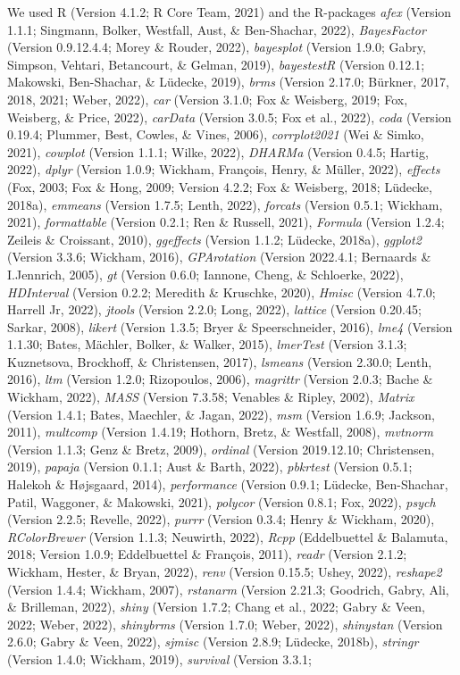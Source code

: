 \documentclass[
  english,
  man]{apa6}
\begin{document}
We used R (Version 4.1.2; R Core Team, 2021) and the R-packages \emph{afex} (Version 1.1.1; Singmann, Bolker, Westfall, Aust, \& Ben-Shachar, 2022), \emph{BayesFactor} (Version 0.9.12.4.4; Morey \& Rouder, 2022), \emph{bayesplot} (Version 1.9.0; Gabry, Simpson, Vehtari, Betancourt, \& Gelman, 2019), \emph{bayestestR} (Version 0.12.1; Makowski, Ben-Shachar, \& Lüdecke, 2019), \emph{brms} (Version 2.17.0; Bürkner, 2017, 2018, 2021; Weber, 2022), \emph{car} (Version 3.1.0; Fox \& Weisberg, 2019; Fox, Weisberg, \& Price, 2022), \emph{carData} (Version 3.0.5; Fox et al., 2022), \emph{coda} (Version 0.19.4; Plummer, Best, Cowles, \& Vines, 2006), \emph{corrplot2021} (Wei \& Simko, 2021), \emph{cowplot} (Version 1.1.1; Wilke, 2022), \emph{DHARMa} (Version 0.4.5; Hartig, 2022), \emph{dplyr} (Version 1.0.9; Wickham, François, Henry, \& Müller, 2022), \emph{effects} (Fox, 2003; Fox \& Hong, 2009; Version 4.2.2; Fox \& Weisberg, 2018; Lüdecke, 2018a), \emph{emmeans} (Version 1.7.5; Lenth, 2022), \emph{forcats} (Version 0.5.1; Wickham, 2021), \emph{formattable} (Version 0.2.1; Ren \& Russell, 2021), \emph{Formula} (Version 1.2.4; Zeileis \& Croissant, 2010), \emph{ggeffects} (Version 1.1.2; Lüdecke, 2018a), \emph{ggplot2} (Version 3.3.6; Wickham, 2016), \emph{GPArotation} (Version 2022.4.1; Bernaards \& I.Jennrich, 2005), \emph{gt} (Version 0.6.0; Iannone, Cheng, \& Schloerke, 2022), \emph{HDInterval} (Version 0.2.2; Meredith \& Kruschke, 2020), \emph{Hmisc} (Version 4.7.0; Harrell Jr, 2022), \emph{jtools} (Version 2.2.0; Long, 2022), \emph{lattice} (Version 0.20.45; Sarkar, 2008), \emph{likert} (Version 1.3.5; Bryer \& Speerschneider, 2016), \emph{lme4} (Version 1.1.30; Bates, Mächler, Bolker, \& Walker, 2015), \emph{lmerTest} (Version 3.1.3; Kuznetsova, Brockhoff, \& Christensen, 2017), \emph{lsmeans} (Version 2.30.0; Lenth, 2016), \emph{ltm} (Version 1.2.0; Rizopoulos, 2006), \emph{magrittr} (Version 2.0.3; Bache \& Wickham, 2022), \emph{MASS} (Version 7.3.58; Venables \& Ripley, 2002), \emph{Matrix} (Version 1.4.1; Bates, Maechler, \& Jagan, 2022), \emph{msm} (Version 1.6.9; Jackson, 2011), \emph{multcomp} (Version 1.4.19; Hothorn, Bretz, \& Westfall, 2008), \emph{mvtnorm} (Version 1.1.3; Genz \& Bretz, 2009), \emph{ordinal} (Version 2019.12.10; Christensen, 2019), \emph{papaja} (Version 0.1.1; Aust \& Barth, 2022), \emph{pbkrtest} (Version 0.5.1; Halekoh \& Højsgaard, 2014), \emph{performance} (Version 0.9.1; Lüdecke, Ben-Shachar, Patil, Waggoner, \& Makowski, 2021), \emph{polycor} (Version 0.8.1; Fox, 2022), \emph{psych} (Version 2.2.5; Revelle, 2022), \emph{purrr} (Version 0.3.4; Henry \& Wickham, 2020), \emph{RColorBrewer} (Version 1.1.3; Neuwirth, 2022), \emph{Rcpp} (Eddelbuettel \& Balamuta, 2018; Version 1.0.9; Eddelbuettel \& François, 2011), \emph{readr} (Version 2.1.2; Wickham, Hester, \& Bryan, 2022), \emph{renv} (Version 0.15.5; Ushey, 2022), \emph{reshape2} (Version 1.4.4; Wickham, 2007), \emph{rstanarm} (Version 2.21.3; Goodrich, Gabry, Ali, \& Brilleman, 2022), \emph{shiny} (Version 1.7.2; Chang et al., 2022; Gabry \& Veen, 2022; Weber, 2022), \emph{shinybrms} (Version 1.7.0; Weber, 2022), \emph{shinystan} (Version 2.6.0; Gabry \& Veen, 2022), \emph{sjmisc} (Version 2.8.9; Lüdecke, 2018b), \emph{stringr} (Version 1.4.0; Wickham, 2019), \emph{survival} (Version 3.3.1; 
\end{document}
